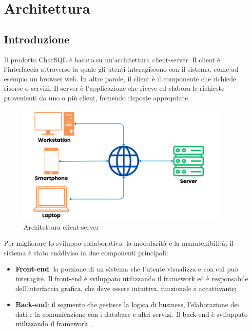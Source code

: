 \section{Architettura}

\subsection{Introduzione}
\par Il prodotto ChatSQL è basato su un'architettura client-server. Il client è l'interfaccia attraverso la quale gli utenti interagiscono con il sistema, come ad esempio un browser web. In altre parole, il client è il componente che richiede risorse o servizi. Il server è l'applicazione che riceve ed elabora le richieste provenienti da uno o più client, fornendo risposte appropriate.

\begin{figure}[H]
  \centering
  \includegraphics[width=0.95\textwidth]{assets/client_server.png}
  \caption{Architettura client-server}
\end{figure}

\par Per migliorare lo sviluppo collaborativo, la modularità e la manutenibilità, il sistema è stato suddiviso in due componenti principali:
\begin{itemize}
  \item \textbf{Front-end}: la porzione di un sistema che l'utente visualizza e con cui può interagire. Il front-end è sviluppato utilizzando il framework  ed è responsabile dell'interfaccia grafica, che deve essere intuitiva, funzionale e accattivante;
  \item \textbf{Back-end}: il segmento che gestisce la logica di business, l'elaborazione dei dati e la comunicazione con i database e altri servizi. Il back-end è sviluppato utilizzando il framework .
\end{itemize}

